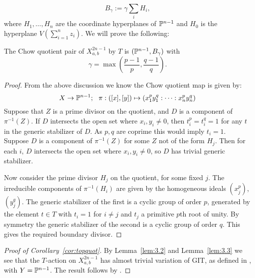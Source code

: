 \begin{equation} \label{eq:divisor}
B_\gamma := \gamma \sum_i H_i,
\end{equation}
where \(H_1,\dots,H_n\) are the coordinate hyperplanes of \(\mathbb{P}^{n-1}\) and \(H_0\) is the hyperplane \(V( \sum_{i=1}^n z_i)\). We will prove the following:
\begin{lemma}\label{lem:1.4}
The Chow quotient pair of \(X_{a,b}^{2n-1}\) by \(T\) is \((\mathbb{P}^{n-1},B_\gamma)\) with
\[
\gamma = \max \left(\frac{p-1}{p}, \frac{q - 1}{q} \right).
\]
\end{lemma}
\begin{proof}
From the above discussion we know the Chow quotient map is given by:
\[
X \to \PP^{n-1}; \ \ \pi:([x],[y]) \mapsto (x_1^p y_1^q: \dots : x_n^p y_n^q )
\]
Suppose that \(Z\) is a prime divisor on the quotient, and \(D\) is a component of \(\pi^{-1}(Z)\). If \(D\) intersects the open set where \(x_i,y_i \neq 0\), then \(t_i^p = t_i^q = 1\) for any \(t\) in the generic stabilizer of \(D\). As \(p,q\) are coprime this would imply \(t_i = 1\). Suppose \(D\) is a component of \(\pi^{-1}(Z)\) for some \(Z\) not of the form \(H_j\). Then for each \(i\), \(D\) intersects the open set where \(x_i,y_i \neq 0\), so \(D\) has trivial generic stabilizer.

Now consider the prime divisor \(H_j\) on the quotient, for some fixed \(j\). The irreducible components of \(\pi^{-1}(H_i)\) are given by the homogeneous ideals \((x_j^p)\), \((y_j^q)\). The generic stabilizer of the first is a cyclic group of order \(p\), generated by the element \(t \in T\) with \(t_i = 1\) for \(i \neq j\) and \(t_j\) a primitive \(p\)th root of unity. By symmetry the generic stabilizer of the second is a cyclic group of order \(q\). This gives the required boundary divisor.
\end{proof}
\begin{proof}[Proof of Corollary~\ref{cor:topquot}]
By Lemma~\ref{lem:3.2} and Lemma~\ref{lem:3.3} we see that the \(T\)-action on \(X^{2n-1}_{a,b}\) has almost trivial variation of GIT, as defined in \cite[Definition 2.7]{suess18-2}, with \(Y = \mathbb{P}^{n-1}\). The result follows by \cite[Proposition 2.9]{suess18-2}.
\end{proof}
